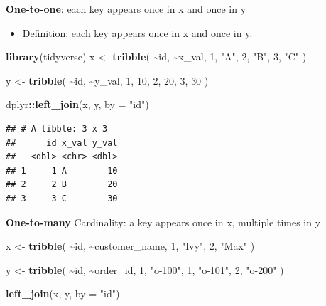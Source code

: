 \documentclass[
  11pt,
]{article}
\newenvironment{Shaded}{\begin{snugshade}}{\end{snugshade}}
\newcommand{\AttributeTok}[1]{\textcolor[rgb]{0.13,0.29,0.53}{#1}}
\newcommand{\DecValTok}[1]{\textcolor[rgb]{0.00,0.00,0.81}{#1}}
\newcommand{\FunctionTok}[1]{\textcolor[rgb]{0.13,0.29,0.53}{\textbf{#1}}}
\newcommand{\NormalTok}[1]{#1}
\newcommand{\OtherTok}[1]{\textcolor[rgb]{0.56,0.35,0.01}{#1}}
\newcommand{\SpecialCharTok}[1]{\textcolor[rgb]{0.81,0.36,0.00}{\textbf{#1}}}
\newcommand{\StringTok}[1]{\textcolor[rgb]{0.31,0.60,0.02}{#1}}
\providecommand{\tightlist}{%
  \setlength{\itemsep}{0pt}\setlength{\parskip}{0pt}}
\begin{document}
\textbf{One-to-one}: each key appears once in x and once in y

\begin{itemize}
\tightlist
\item
  Definition: each key appears once in x and once in y.
\end{itemize}

\begin{Shaded}
\begin{Highlighting}[]
\FunctionTok{library}\NormalTok{(tidyverse)}
\NormalTok{x }\OtherTok{\textless{}{-}} \FunctionTok{tribble}\NormalTok{(}
  \SpecialCharTok{\textasciitilde{}}\NormalTok{id, }\SpecialCharTok{\textasciitilde{}}\NormalTok{x\_val,}
   \DecValTok{1}\NormalTok{,  }\StringTok{"A"}\NormalTok{,}
   \DecValTok{2}\NormalTok{,  }\StringTok{"B"}\NormalTok{,}
   \DecValTok{3}\NormalTok{,  }\StringTok{"C"}
\NormalTok{)}

\NormalTok{y }\OtherTok{\textless{}{-}} \FunctionTok{tribble}\NormalTok{(}
  \SpecialCharTok{\textasciitilde{}}\NormalTok{id, }\SpecialCharTok{\textasciitilde{}}\NormalTok{y\_val,}
   \DecValTok{1}\NormalTok{,  }\DecValTok{10}\NormalTok{,}
   \DecValTok{2}\NormalTok{,  }\DecValTok{20}\NormalTok{,}
   \DecValTok{3}\NormalTok{,  }\DecValTok{30}
\NormalTok{)}

\NormalTok{dplyr}\SpecialCharTok{::}\FunctionTok{left\_join}\NormalTok{(x, y, }\AttributeTok{by =} \StringTok{"id"}\NormalTok{)}
\end{Highlighting}
\end{Shaded}

\begin{verbatim}
## # A tibble: 3 x 3
##      id x_val y_val
##   <dbl> <chr> <dbl>
## 1     1 A        10
## 2     2 B        20
## 3     3 C        30
\end{verbatim}

\textbf{One-to-many} Cardinality: a key appears once in x, multiple
times in y

\begin{Shaded}
\begin{Highlighting}[]
\NormalTok{x }\OtherTok{\textless{}{-}} \FunctionTok{tribble}\NormalTok{(}
  \SpecialCharTok{\textasciitilde{}}\NormalTok{id, }\SpecialCharTok{\textasciitilde{}}\NormalTok{customer\_name,}
   \DecValTok{1}\NormalTok{,  }\StringTok{"Ivy"}\NormalTok{,}
   \DecValTok{2}\NormalTok{,  }\StringTok{"Max"}
\NormalTok{)}

\NormalTok{y }\OtherTok{\textless{}{-}} \FunctionTok{tribble}\NormalTok{(}
  \SpecialCharTok{\textasciitilde{}}\NormalTok{id, }\SpecialCharTok{\textasciitilde{}}\NormalTok{order\_id,}
   \DecValTok{1}\NormalTok{,  }\StringTok{"o{-}100"}\NormalTok{,}
   \DecValTok{1}\NormalTok{,  }\StringTok{"o{-}101"}\NormalTok{,}
   \DecValTok{2}\NormalTok{,  }\StringTok{"o{-}200"}
\NormalTok{)}

\FunctionTok{left\_join}\NormalTok{(x, y, }\AttributeTok{by =} \StringTok{"id"}\NormalTok{)}
\end{Highlighting}
\end{Shaded}
\end{document}
